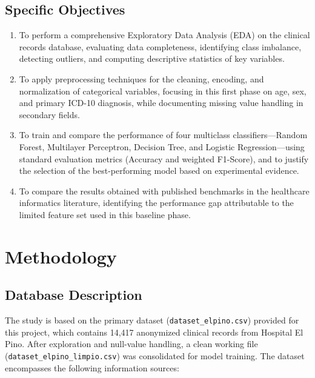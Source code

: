 \documentclass{IEEEtran}
\begin{document}
\subsection{Specific Objectives}
\begin{enumerate}
    \item To perform a comprehensive Exploratory Data Analysis (EDA) on the clinical records database, evaluating data completeness, identifying class imbalance, detecting outliers, and computing descriptive statistics of key variables.
    \item To apply preprocessing techniques for the cleaning, encoding, and normalization of categorical variables, focusing in this first phase on age, sex, and primary ICD-10 diagnosis, while documenting missing value handling in secondary fields.
    \item To train and compare the performance of four multiclass classifiers---Random Forest, Multilayer Perceptron, Decision Tree, and Logistic Regression---using standard evaluation metrics (Accuracy and weighted F1-Score), and to justify the selection of the best-performing model based on experimental evidence.
    \item To compare the results obtained with published benchmarks in the healthcare informatics literature, identifying the performance gap attributable to the limited feature set used in this baseline phase.
\end{enumerate}

\section{Methodology}

\subsection{Database Description}
The study is based on the primary dataset (\texttt{dataset\_elpino.csv}) provided for this project, which contains 14,417 anonymized clinical records from Hospital El Pino. After exploration and null-value handling, a clean working file (\texttt{dataset\_elpino\_limpio.csv}) was consolidated for model training. The dataset encompasses the following information sources:
\end{document}
